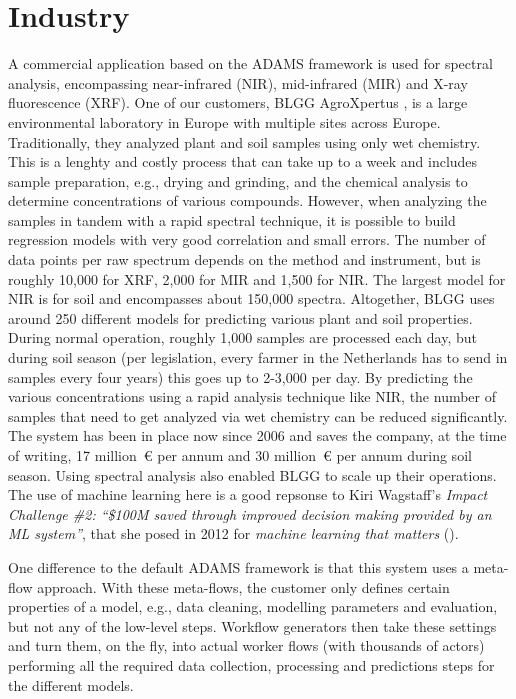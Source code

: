 \documentclass[wcp]{jmlr}
\begin{document}
\section{Industry}
A commercial application based on the ADAMS framework is used for spectral analysis, encompassing near-infrared (NIR), mid-infrared (MIR) and X-ray fluorescence (XRF). One of our customers, BLGG AgroXpertus
, is a large environmental laboratory in Europe with multiple sites across Europe. Traditionally, they analyzed plant and soil samples using only wet chemistry. This is a lenghty and costly process that can take up to a week and  includes sample preparation, e.g., drying and grinding, and the chemical analysis to determine concentrations of various compounds. However, when analyzing the samples in tandem with a rapid spectral technique, it is possible to build regression models with very good correlation and small errors. The number of data points per raw spectrum depends on the method and instrument, but is roughly 10,000 for XRF, 2,000 for MIR and 1,500 for NIR. The largest model for NIR is for soil and encompasses about 150,000 spectra. Altogether, BLGG uses around 250 different models for predicting various plant and soil properties. During normal operation, roughly 1,000 samples are processed each day, but during soil season (per legislation, every farmer in the Netherlands has to send in samples every four years) this goes up to 2-3,000 per day. By predicting the various concentrations using a rapid analysis technique like NIR, the number of samples that need to get analyzed via wet chemistry can be reduced significantly. The system has been in place now since 2006 and saves the company, at the time of writing, 17 million~\euro{} per annum and 30 million~\euro{} per annum during soil season. Using spectral analysis also enabled BLGG to scale up their operations. The use of machine learning here is a good repsonse to Kiri Wagstaff's \textit{Impact Challenge \#2: ``\$100M saved through improved decision making provided by an ML system''}, that she posed in 2012 for \textit{machine learning that matters} (\cite{wagstaff}).

One difference to the default ADAMS framework is that this system uses a meta-flow approach. With these meta-flows, the customer only defines certain properties of a model, e.g., data cleaning, modelling parameters and evaluation, but not any of the low-level steps. Workflow generators then take these settings and turn them, on the fly, into actual worker flows (with thousands of actors) performing all the required data collection, processing and predictions steps for the different models.



\end{document}
